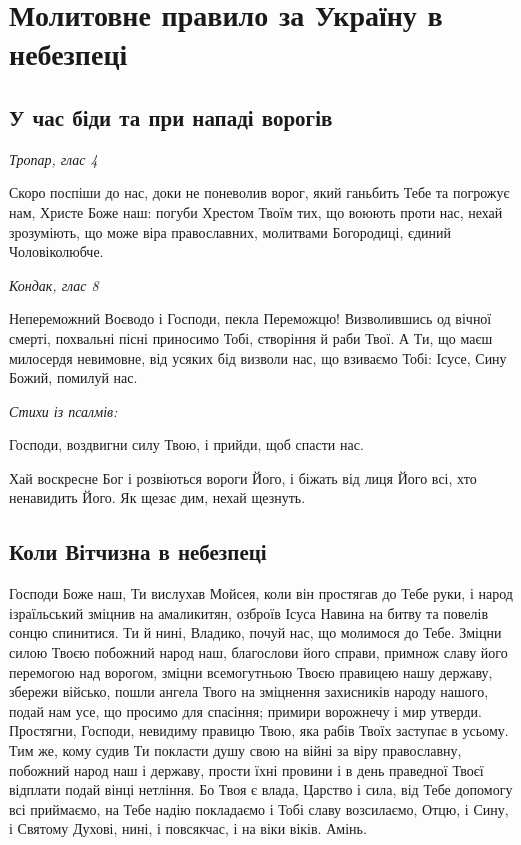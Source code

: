 \documentclass[chapters.tex]{subfiles}
\begin{document}
\chapter{Молитовне правило за Україну в небезпеці}
\section{У час біди та при нападі ворогів}
\emph{Тропар, глас 4}

Скоро поспіши до нас, доки не поневолив ворог, який ганьбить Тебе та погрожує нам, Христе Боже наш: погуби Хрестом Твоїм тих, що воюють проти нас, нехай зрозуміють, що може віра православних, молитвами Богородиці, єдиний Чоловіколюбче.

\emph{Кондак, глас 8}

Непереможний Воєводо і Господи, пекла Переможцю! Визволившись од вічної смерті, похвальні пісні приносимо Тобі, створіння й раби Твої. А Ти, що маєш милосердя невимовне, від усяких бід визволи нас, що взиваємо Тобі: Ісусе, Сину Божий, помилуй нас.

\emph{Стихи із псалмів:}

Господи, воздвигни силу Твою, і прийди, щоб спасти нас.

Хай воскресне Бог і розвіються вороги Його, і біжать від лиця Його всі, хто ненавидить Його. Як щезає дим, нехай щезнуть.

\section{Коли Вітчизна в небезпеці}
Господи Боже наш, Ти вислухав Мойсея, коли він простягав до Тебе руки, і народ ізраїльський зміцнив на амаликитян, озброїв Ісуса Навина на битву та повелів сонцю спинитися. Ти й нині, Владико, почуй нас, що молимося до Тебе. Зміцни силою Твоєю побожний народ наш, благослови його справи, примнож славу його перемогою над ворогом, зміцни всемогутньою Твоєю правицею нашу державу, збережи військо, пошли ангела Твого на зміцнення захисників народу нашого, подай нам усе, що просимо для спасіння; примири ворожнечу і мир утверди. Простягни, Господи, невидиму правицю Твою, яка рабів Твоїх заступає в усьому. Тим же, кому судив Ти покласти душу свою на війні за віру православну, побожний народ наш і державу, прости їхні провини і в день праведної Твоєї відплати подай вінці нетління. Бо Твоя є влада, Царство і сила, від Тебе допомогу всі приймаємо, на Тебе надію покладаємо і Тобі славу возсилаємо, Отцю, і Сину, і Святому Духові, нині, і повсякчас, і на віки віків. Амінь.
\end{document}
